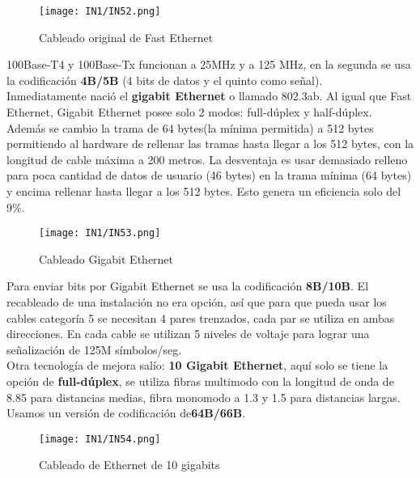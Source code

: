 \documentclass[
	12pt, %
	fleqn, %
	a4paper, %
	oneside, %
]{LegrandOrangeBook}
\begin{document}
\begin{figure}[H]
\centering
\texttt{[image: IN1/IN52.png]}
\caption{Cableado original de Fast Ethernet}
\end{figure}
100Base-T4 y 100Base-Tx funcionan a 25MHz y a 125 MHz, en la segunda se usa la codificación \textbf{4B/5B} (4 bits de datos y el quinto como señal). \\
Inmediatamente nació el \textbf{gigabit Ethernet} o llamado 802.3ab. Al igual que Fast Ethernet, Gigabit Ethernet posee solo 2 modos: full-dúplex y half-dúplex. Además se cambio la trama de 64 bytes(la mínima permitida) a 512 bytes permitiendo al hardware de rellenar las tramas hasta llegar a los 512 bytes, con la longitud de cable máxima a 200 metros. La desventaja es usar demasiado relleno para poca cantidad de datos de usuario (46 bytes) en la trama mínima (64 bytes) y encima rellenar hasta llegar a los 512 bytes. Esto genera un eficiencia solo del 9\%.
\begin{figure}[H]
\centering
\texttt{[image: IN1/IN53.png]}
\caption{Cableado Gigabit Ethernet}
\end{figure}
Para enviar bits por Gigabit Ethernet se usa la codificación \textbf{8B/10B}. El recableado de una instalación no era opción, así que para que pueda usar los cables categoría 5 se necesitan 4 pares trenzados, cada par se utiliza en ambas direcciones. En cada cable se utilizan 5 niveles de voltaje para lograr una señalización de 125M símbolos/seg.\\
Otra tecnología de mejora salío: \textbf{10 Gigabit Ethernet}, aquí solo se tiene la opción de \textbf{full-dúplex}, se utiliza fibras multimodo con la longitud de onda de 8.85 para distancias medias, fibra monomodo a 1.3 y 1.5 para distancias largas. Usamos un versión de codificación de\textbf{64B/66B}.
\begin{figure}[H]
\centering
\texttt{[image: IN1/IN54.png]}
\caption{Cableado de Ethernet de 10 gigabits}
\end{figure}
\end{document}
